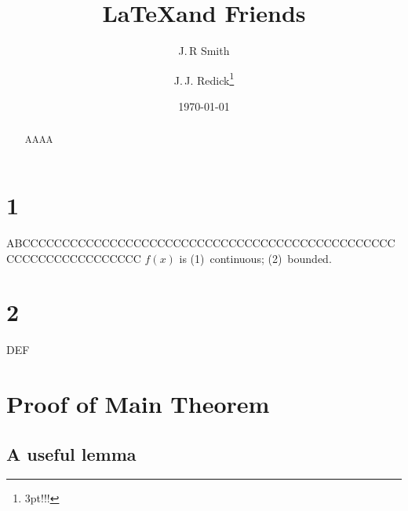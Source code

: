 \documentclass[a4paper,11pt]{article}
\author{J.\,R Smith \and J.\,J. Redick\thanks{3pt!!!}}
\title{\LaTeX and Friends}
\date{\today}
\begin{document}
\maketitle
	\begin{abstract}
	AAAA
	\end{abstract}
\tableofcontents
\section{1}
ABCCCCCCCCCCCCCCCCCCCCCCCCCCCCCCCCCCCCCCCCCCCCCCCCCCCCCCCCCCCCCCCC\label{ch:section1}
$f(x)$ is (1)~continuous; (2)~bounded.
\section{2}
DEF

\appendix
\section{Proof of Main Theorem}
\subsection{A useful lemma}
\end{document}
